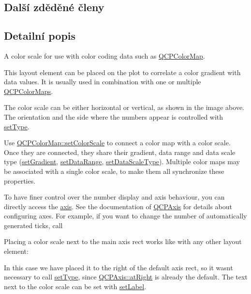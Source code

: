 \subsection*{Další zděděné členy}


\subsection{Detailní popis}
A color scale for use with color coding data such as \hyperlink{classQCPColorMap}{Q\+C\+P\+Color\+Map}. 

This layout element can be placed on the plot to correlate a color gradient with data values. It is usually used in combination with one or multiple \hyperlink{classQCPColorMap}{Q\+C\+P\+Color\+Maps}.



The color scale can be either horizontal or vertical, as shown in the image above. The orientation and the side where the numbers appear is controlled with \hyperlink{classQCPColorScale_a1bf9bdb291927c422dd66b404b206f1f}{set\+Type}.

Use \hyperlink{classQCPColorMap_aa828921db364fe3c6af4619580ab85fd}{Q\+C\+P\+Color\+Map\+::set\+Color\+Scale} to connect a color map with a color scale. Once they are connected, they share their gradient, data range and data scale type (\hyperlink{classQCPColorScale_a1f29583bb6f1e7f473b62fb712be3940}{set\+Gradient}, \hyperlink{classQCPColorScale_abe88633003a26d1e756aa74984587fef}{set\+Data\+Range}, \hyperlink{classQCPColorScale_aeb6107d67dd7325145b2498abae67fc3}{set\+Data\+Scale\+Type}). Multiple color maps may be associated with a single color scale, to make them all synchronize these properties.

To have finer control over the number display and axis behaviour, you can directly access the \hyperlink{classQCPColorScale_a1205bd67c8a33d5818aac1f6eea016a4}{axis}. See the documentation of \hyperlink{classQCPAxis}{Q\+C\+P\+Axis} for details about configuring axes. For example, if you want to change the number of automatically generated ticks, call 
\begin{DoxyCodeInclude}
\end{DoxyCodeInclude}
 Placing a color scale next to the main axis rect works like with any other layout element\+: 
\begin{DoxyCodeInclude}
\end{DoxyCodeInclude}
In this case we have placed it to the right of the default axis rect, so it wasn\textquotesingle{}t necessary to call \hyperlink{classQCPColorScale_a1bf9bdb291927c422dd66b404b206f1f}{set\+Type}, since \hyperlink{classQCPAxis_ae2bcc1728b382f10f064612b368bc18aadf5509f7d29199ef2f263b1dd224b345}{Q\+C\+P\+Axis\+::at\+Right} is already the default. The text next to the color scale can be set with \hyperlink{classQCPColorScale_aee124ae8396320cacf8276e9a0fbb8ce}{set\+Label}.

